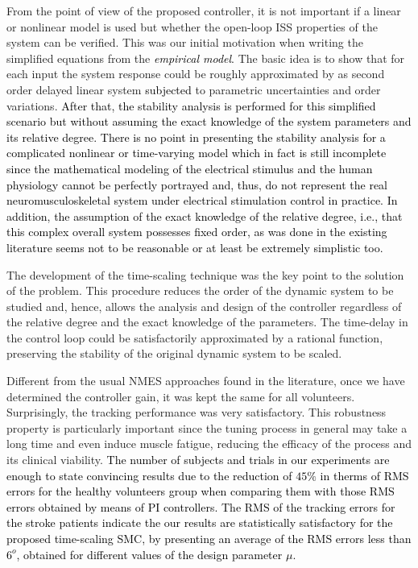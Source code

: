 \documentclass[review]{elsarticle}
\begin{document}
\newpage

From the point of view of the proposed controller, it is not important if a linear or nonlinear model is used but
whether the open-loop ISS properties of the system can be verified. This was our initial motivation when writing the simplified equations from the \textcolor{black}{\textit{empirical model}.} The basic idea is to show that for each input the system response could be roughly approximated by as second order delayed linear system \textcolor{black}{subjected} to parametric uncertainties and order variations.
\textcolor{black}{After that, the stability analysis is performed for this simplified scenario but without assuming the exact knowledge of the system parameters and its relative degree. There is no point in presenting the stability analysis for a complicated nonlinear or time-varying model which in fact is still incomplete since the mathematical modeling of the electrical stimulus and the human physiology cannot be perfectly portrayed and, thus, do not represent the real neuromusculoskeletal system under electrical stimulation control in practice. In addition, the assumption of the exact knowledge of the relative degree, i.e., that this complex overall system possesses fixed order, as was done in the existing literature seems not to be reasonable or at least be extremely simplistic too.}



The development of the time-scaling technique was the key point to the solution of the problem. This procedure reduces the order of the dynamic system to be studied and, hence, allows the analysis and design of the controller regardless of the relative degree and the exact knowledge of the parameters. The time-delay in the control loop could be satisfactorily approximated by a rational function, preserving the stability of the original dynamic system to be scaled. %

Different from the usual NMES approaches found in the literature, once we have determined the controller gain, it was kept the same for all volunteers. Surprisingly, the tracking performance was very satisfactory. This robustness property is particularly important since the tuning process in general may take a long time and even induce muscle fatigue, reducing the efficacy of the process and its clinical viability. \textcolor{black}{The number of subjects and trials in our experiments are enough to state convincing results due to the reduction of $45\%$ in therms of RMS errors for the healthy volunteers group when comparing them with those RMS errors obtained by means of PI controllers. The RMS of the tracking errors for the stroke patients indicate the our results are statistically satisfactory for the proposed time-scaling SMC, by presenting an average of the RMS errors less than $6^{o}$, obtained for different values of the design parameter $\mu$.}
\end{document}

